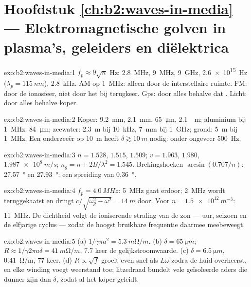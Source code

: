 \section*{Hoofdstuk \ref{ch:b2:waves-in-media} --- Elektromagnetische golven
in plasma's, geleiders en diëlektrica}

\begin{solution}{exo:b2:waves-in-media:1}
$f_p \approx 9\sqrt n$ Hz: \qty{2.8}{MHz}, \qty{9}{MHz}, \qty{9}{GHz},
\qty{2.6e15}{Hz} ($\lambda_p = \qty{115}{nm}$), \qty{2.8}{kHz}. AM op
\qty{1}{MHz}: alleen door de interstellaire ruimte. FM: door de ionosfeer,
niet door het  bij terugkeer. Gps: door alles behalve dat .
Licht: door alles behalve koper.
\end{solution}

\begin{solution}{exo:b2:waves-in-media:2}
Koper: \qty{9.2}{mm}, \qty{2.1}{mm}, \qty{65}{\micro m}, \qty{2.1}{\micro
m}; aluminium bij \qty{1}{MHz}: \qty{84}{\micro m}; zeewater: \qty{2.3}{m}
bij \qty{10}{kHz}, \qty{7}{mm} bij \qty{1}{GHz}; grond: \qty{5}{m} bij
\qty{1}{MHz}. Een onderzeeër op \qty{10}{m} heeft
$\delta
\gtrsim \qty{10}{m}$ nodig: onder ongeveer \qty{500}{Hz}.
\end{solution}

\begin{solution}{exo:b2:waves-in-media:3}
$n = 1.528$, $1.515$, $1.509$; $v = 1.963$, $1.980$, $\qty{1.987e8}{m/s}$;
$n_g = n +
2B/\lambda^2 = 1.545$. Brekingshoeken $\arcsin(0.707/n)$:
\qty{27.57}{\degree} en \qty{27.93}{\degree}: een spreiding van
\qty{0.36}{\degree}.
\end{solution}

\begin{solution}{exo:b2:waves-in-media:4}
$f_p = \qty{4.0}{MHz}$: \qty{5}{MHz} gaat erdoor; \qty{2}{MHz} wordt
teruggekaatst en dringt $c/\sqrt{\omega_p^2 - \omega^2} = \qty{14}{m}$ door.
Voor $n = \qty{1.5e12}{m^{-3}}$: \qty{11}{MHz}. De dichtheid volgt de
ioniserende straling van de zon --- uur, seizoen en de elfjarige cyclus ---
zodat de hoogst bruikbare frequentie daarmee meebeweegt.
\end{solution}

\begin{solution}{exo:b2:waves-in-media:5}
(a) $1/\gamma\pi a^2 = \qty{5.3}{m\ohm/m}$. (b)
$\delta = \qty{65}{\micro m}$;
$R \approx 1/\gamma2\pi a\delta
= \qty{41}{m\ohm/m}$, $7.7$ keer de
gelijkstroomwaarde. (c) $\delta = \qty{6.5}{\micro m}$, \qty{0.41}{\ohm/m},
$77$ keer. (d) $R \propto \sqrt f$ groeit even snel als $L\omega$ zodra de
huid overheerst, en elke winding voegt weerstand toe; litzedraad bundelt
vele geïsoleerde aders die dunner zijn dan $\delta$, zodat al het koper
geleidt.
\end{solution}

